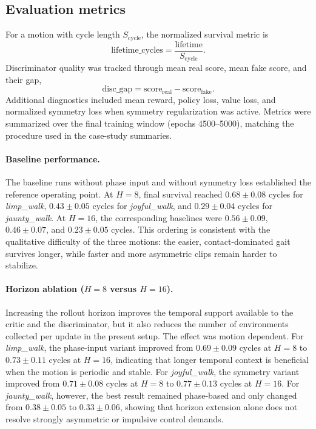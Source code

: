 \subsection{Evaluation metrics}
For a motion with cycle length $S_{\text{cycle}}$, the normalized survival metric is
\[
    \text{lifetime\_cycles} = \frac{\text{lifetime}}{S_{\text{cycle}}}.
\]
Discriminator quality was tracked through mean real score, mean fake score, and their gap,
\[
    \text{disc\_gap} = \text{score}_{\text{real}} - \text{score}_{\text{fake}}.
\]
Additional diagnostics included mean reward, policy loss, value loss, and normalized symmetry loss when symmetry regularization was active. Metrics were summarized over the final training window (epochs 4500--5000), matching the procedure used in the case-study summaries.

\paragraph{Baseline performance.}
The baseline runs without phase input and without symmetry loss established the reference operating point. At $H=8$, final survival reached $0.68 \pm 0.08$ cycles for \textit{limp\_walk}, $0.43 \pm 0.05$ cycles for \textit{joyful\_walk}, and $0.29 \pm 0.04$ cycles for \textit{jaunty\_walk}. At $H=16$, the corresponding baselines were $0.56 \pm 0.09$, $0.46 \pm 0.07$, and $0.23 \pm 0.05$ cycles. This ordering is consistent with the qualitative difficulty of the three motions: the easier, contact-dominated gait survives longer, while faster and more asymmetric clips remain harder to stabilize.

\paragraph{Horizon ablation ($H=8$ versus $H=16$).}
Increasing the rollout horizon improves the temporal support available to the critic and the discriminator, but it also reduces the number of environments collected per update in the present setup. The effect was motion dependent. For \textit{limp\_walk}, the phase-input variant improved from $0.69 \pm 0.09$ cycles at $H=8$ to $0.73 \pm 0.11$ cycles at $H=16$, indicating that longer temporal context is beneficial when the motion is periodic and stable. For \textit{joyful\_walk}, the symmetry variant improved from $0.71 \pm 0.08$ cycles at $H=8$ to $0.77 \pm 0.13$ cycles at $H=16$. For \textit{jaunty\_walk}, however, the best result remained phase-based and only changed from $0.38 \pm 0.05$ to $0.33 \pm 0.06$, showing that horizon extension alone does not resolve strongly asymmetric or impulsive control demands.

